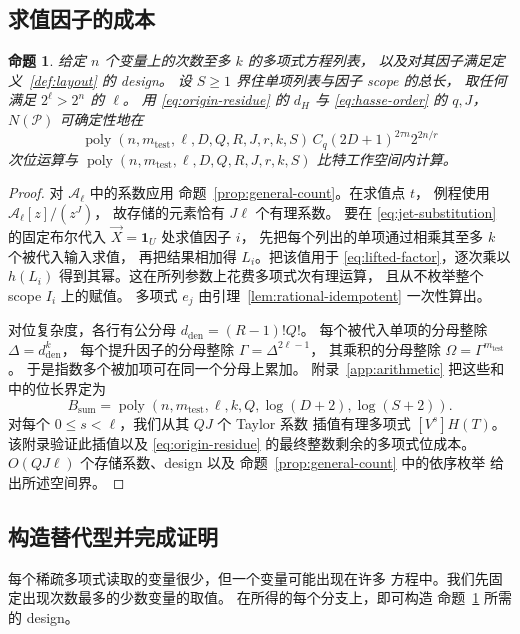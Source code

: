 \documentclass[11pt,reqno]{amsart}
\numberwithin{equation}{section}
\newtheorem{proposition}[theorem]{命题}
\theoremstyle{definition}\newtheorem{definition}[theorem]{定义}
\theoremstyle{remark}\newtheorem{remark}[theorem]{注}
\newcommand{\poly}{\operatorname{poly}}
\renewcommand{\le}{\leqslant}
\renewcommand{\ge}{\geqslant}
\begin{document}
\subsection{求值因子的成本}\label{subsec:one-query-cost}
\begin{proposition}\label{prop:count}
给定 $n$ 个变量上的次数至多 $k$ 的多项式方程列表，
以及对其因子满足定义~\ref{def:layout} 的 design。
设 $S\ge1$ 界住单项列表与因子 scope 的总长，
取任何满足 $2^\ell>2^n$ 的 $\ell$。
用 \eqref{eq:origin-residue} 的 $d_H$ 与
\eqref{eq:hasse-order} 的 $q,J$，
$N(\mathcal P)$ 可确定性地在
\[
 \poly(n,m_{\mathrm{test}},\ell,D,Q,R,J,r,k,S)\,
 C_q(2D+1)^{2\tau n}2^{2n/r}
\]
次位运算与 $\poly(n,m_{\mathrm{test}},\ell,D,Q,R,J,r,k,S)$
比特工作空间内计算。
\end{proposition}
\begin{proof}
对 $\mathcal A_\ell$ 中的系数应用
命题~\ref{prop:general-count}。在求值点 $t$，
例程使用 $\mathcal A_\ell[z]/(z^J)$，
故存储的元素恰有 $J\ell$ 个有理系数。
要在 \eqref{eq:jet-substitution} 的固定布尔代入
$\vec X=\mathbf1_U$ 处求值因子 $i$，
先把每个列出的单项通过相乘其至多 $k$ 个被代入输入求值，
再把结果相加得 $L_i$。把该值用于
\eqref{eq:lifted-factor}，逐次乘以 $h(L_i)$
得到其幂。这在所列参数上花费多项式次有理运算，
且从不枚举整个 scope $I_i$ 上的赋值。
多项式 $e_j$ 由引理~\ref{lem:rational-idempotent}
一次性算出。

对位复杂度，各行有公分母 $d_{\mathrm{den}}=(R-1)!Q!$。
每个被代入单项的分母整除 $\Delta=d_{\mathrm{den}}^k$，
每个提升因子的分母整除 $\Gamma=\Delta^{2\ell-1}$，
其乘积的分母整除 $\Omega=\Gamma^{m_{\mathrm{test}}}$。
于是指数多个被加项可在同一个分母上累加。
附录~\ref{app:arithmetic} 把这些和中的位长界定为
\begin{equation}\label{eq:sum-bit-bound}
 B_{\mathrm{sum}}=\poly(n,m_{\mathrm{test}},\ell,k,Q,\log(D+2),\log(S+2)).
\end{equation}
对每个 $0\le s<\ell$，我们从其 $QJ$ 个 Taylor 系数
插值有理多项式 $[V^s]H(T)$。
该附录验证此插值以及 \eqref{eq:origin-residue}
的最终整数剩余的多项式位成本。
$O(QJ\ell)$ 个存储系数、design 以及
命题~\ref{prop:general-count} 中的依序枚举
给出所述空间界。
\end{proof}

\subsection{构造替代型并完成证明}\label{subsec:sparse-queries}
每个稀疏多项式读取的变量很少，但一个变量可能出现在许多
方程中。我们先固定出现次数最多的少数变量的取值。
在所得的每个分支上，即可构造
命题~\ref{prop:count} 所需的 design。
\end{document}
